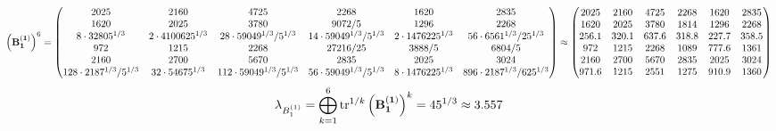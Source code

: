 \documentclass[10pt,a4paper]{article}
\begin{document}
	\[
		\left(\bold{B_1^{(1)}}\right)^{6} = 
		\begin{pmatrix}
			{{2025}}{} & {{2160}}{} & {{4725}}{} & {{2268}}{} & {{1620}}{} & {{2835}}{} \\
			{{1620}}{} & {{2025}}{} & {{3780}}{} & {{9072}} / {{5}} & {{1296}}{} & {{2268}}{} \\
			{{8} \cdot {32805^ {1 / 3}}}{} & {{2} \cdot {4100625^ {1 / 3}}}{} & {{28} \cdot {59049^ {1 / 3}}} / {{5^ {1 / 3}}} & {{14} \cdot {59049^ {1 / 3}}} / {{5^ {1 / 3}}} & {{2} \cdot {1476225^ {1 / 3}}}{} & {{56} \cdot {6561^ {1 / 3}}} / {{25^ {1 / 3}}} \\
			{{972}}{} & {{1215}}{} & {{2268}}{} & {{27216}} / {{25}} & {{3888}} / {{5}} & {{6804}} / {{5}} \\
			{{2160}}{} & {{2700}}{} & {{5670}}{} & {{2835}}{} & {{2025}}{} & {{3024}}{} \\
			{{128} \cdot {2187^ {1 / 3}}} / {{5^ {1 / 3}}} & {{32} \cdot {54675^ {1 / 3}}}{} & {{112} \cdot {59049^ {1 / 3}}} / {{5^ {1 / 3}}} & {{56} \cdot {59049^ {1 / 3}}} / {{5^ {1 / 3}}} & {{8} \cdot {1476225^ {1 / 3}}}{} & {{896} \cdot {2187^ {1 / 3}}} / {{625^ {1 / 3}}} \\
		\end{pmatrix}
		\approx
		\begin{pmatrix}
			2025     & 2160     & 4725     & 2268     & 1620     & 2835     \\
			1620     & 2025     & 3780     & 1814     & 1296     & 2268     \\
			256.1    & 320.1    & 637.6    & 318.8    & 227.7    & 358.5    \\
			972      & 1215     & 2268     & 1089     & 777.6    & 1361     \\
			2160     & 2700     & 5670     & 2835     & 2025     & 3024     \\
			971.6    & 1215     & 2551     & 1275     & 910.9    & 1360     \\
		\end{pmatrix}
	\]
	\[
		\lambda_{B_1^{(1)}} =  \bigoplus ^{6} _{k = 1} \operatorname{tr} ^{1 / k} \left( \bold{B_1^{(1)}} \right)^k = {{45^ {1 / 3}}}{}\approx 3.557
	\]
\end{document}
